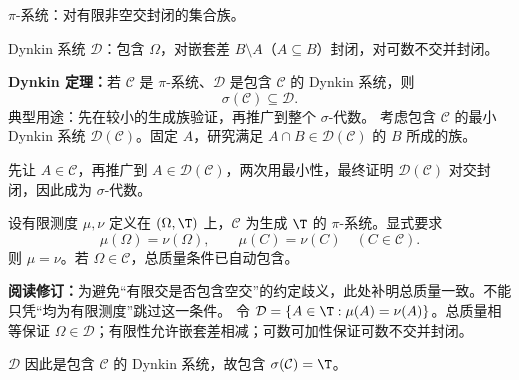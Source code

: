 $\pi$-系统：对有限非空交封闭的集合族。

Dynkin 系统 $\mathcal D$：包含 $\Omega$，对嵌套差 $B\setminus A$（$A\subseteq B$）封闭，对可数不交并封闭。

\textbf{Dynkin 定理：}若 $\mathcal C$ 是 $\pi$-系统、$\mathcal D$ 是包含 $\mathcal C$ 的 Dynkin 系统，则
\[
\sigma(\mathcal C)\subseteq\mathcal D.
\]
典型用途：先在较小的生成族验证，再推广到整个 $\sigma$-代数。
考虑包含 $\mathcal C$ 的最小 Dynkin 系统 $\mathcal D(\mathcal C)$。固定 $A$，研究满足 $A\cap B\in\mathcal D(\mathcal C)$ 的 $B$ 所成的族。

先让 $A\in\mathcal C$，再推广到 $A\in\mathcal D(\mathcal C)$，两次用最小性，最终证明 $\mathcal D(\mathcal C)$ 对交封闭，因此成为 $\sigma$-代数。

设有限测度 $\mu,\nu$ 定义在 $(\Omega,\T)$ 上，$\mathcal C$ 为生成 $\T$ 的 $\pi$-系统。显式要求
\[
\mu(\Omega)=\nu(\Omega),\qquad
\mu(C)=\nu(C)\quad(C\in\mathcal C).
\]
则 $\mu=\nu$。若 $\Omega\in\mathcal C$，总质量条件已自动包含。

\textbf{阅读修订：}为避免“有限交是否包含空交”的约定歧义，此处补明总质量一致。不能只凭“均为有限测度”跳过这一条件。
令 $\mathcal D=\{A\in\T:\mu(A)=\nu(A)\}$。总质量相等保证 $\Omega\in\mathcal D$；有限性允许嵌套差相减；可数可加性保证可数不交并封闭。

$\mathcal D$ 因此是包含 $\mathcal C$ 的 Dynkin 系统，故包含 $\sigma(\mathcal C)=\T$。
